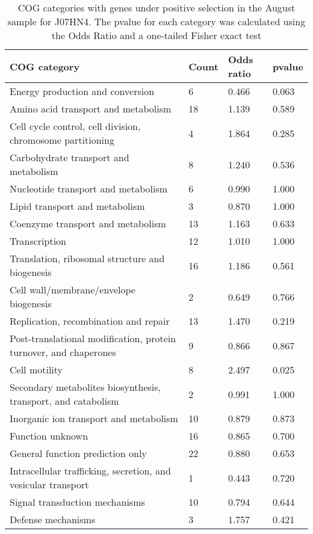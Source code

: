 \begin{table}[hb]
\footnotesize 
	\tabcolsep=0.11cm 
\caption{COG categories with genes under positive selection in the August sample for J07HN4. The pvalue for each category was calculated using the Odds Ratio and a one-tailed Fisher exact test \\} 
\begin{tabularx}{\textwidth}{L{6cm}R{2cm}R{2cm}R{2cm}} 
\hline 
\textbf{COG category} & \textbf{Count} & \textbf{Odds ratio} & \textbf{pvalue} \\ 
\hline 
Energy production and conversion & 6 & 0.466 & 0.063 \\ 
Amino acid transport and metabolism & 18 & 1.139 & 0.589 \\ 
Cell cycle control, cell division, chromosome partitioning & 4 & 1.864 & 0.285 \\ 
Carbohydrate transport and metabolism & 8 & 1.240 & 0.536 \\ 
Nucleotide transport and metabolism & 6 & 0.990 & 1.000 \\ 
Lipid transport and metabolism & 3 & 0.870 & 1.000 \\ 
Coenzyme transport and metabolism & 13 & 1.163 & 0.633 \\ 
Transcription & 12 & 1.010 & 1.000 \\ 
Translation, ribosomal structure and biogenesis & 16 & 1.186 & 0.561 \\ 
Cell wall/membrane/envelope biogenesis & 2 & 0.649 & 0.766 \\ 
Replication, recombination and repair & 13 & 1.470 & 0.219 \\ 
Post-translational modification, protein turnover, and chaperones & 9 & 0.866 & 0.867 \\ 
Cell motility & 8 & 2.497 & 0.025 \\ 
Secondary metabolites biosynthesis, transport, and catabolism & 2 & 0.991 & 1.000 \\ 
Inorganic ion transport and metabolism & 10 & 0.879 & 0.873 \\ 
Function unknown & 16 & 0.865 & 0.700 \\ 
General function prediction only & 22 & 0.880 & 0.653 \\ 
Intracellular trafficking, secretion, and vesicular transport & 1 & 0.443 & 0.720 \\ 
Signal transduction mechanisms & 10 & 0.794 & 0.644 \\ 
Defense mechanisms & 3 & 1.757 & 0.421 \\ 
\end{tabularx} 
\label{August_COG_Selection_J07HN4} 
 \end{table} 

